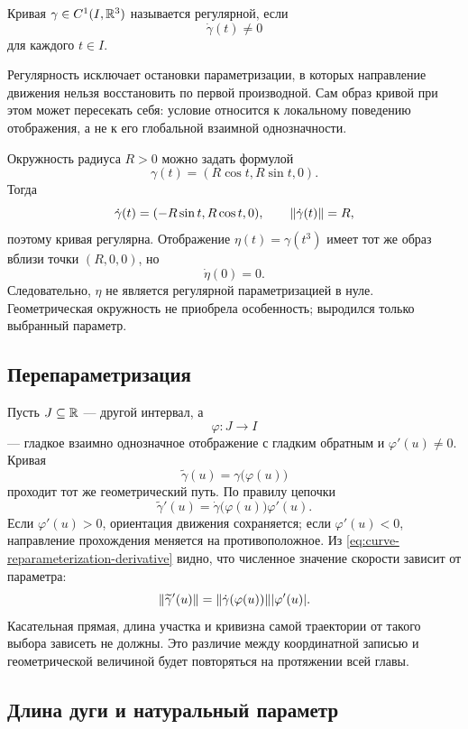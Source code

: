 \begin{definition}
Кривая \(\gamma\in C^1(I,\mathbb{R}^3)\) называется регулярной, если
\[
\dot\gamma(t)\neq0
\]
для каждого \(t\in I\).
\end{definition}

Регулярность исключает остановки параметризации, в которых направление движения нельзя восстановить по первой производной. Сам образ кривой при этом может пересекать себя: условие относится к локальному поведению отображения, а не к его глобальной взаимной однозначности.

\begin{example}
Окружность радиуса \(R>0\) можно задать формулой
\[
\gamma(t)=(R\cos t,R\sin t,0).
\]
Тогда
\[
\dot\gamma(t)=(-R\sin t,R\cos t,0),
\qquad
\lVert\dot\gamma(t)\rVert=R,
\]
поэтому кривая регулярна. Отображение \(\eta(t)=\gamma(t^3)\) имеет тот же образ вблизи точки \((R,0,0)\), но
\[
\dot\eta(0)=0.
\]
Следовательно, \(\eta\) не является регулярной параметризацией в нуле. Геометрическая окружность не приобрела особенность; выродился только выбранный параметр.
\end{example}

\subsection{Перепараметризация}

Пусть \(J\subseteq\mathbb{R}\) --- другой интервал, а
\[
\varphi:J\to I
\]
--- гладкое взаимно однозначное отображение с гладким обратным и \(\varphi'(u)\neq0\). Кривая
\[
\widetilde\gamma(u)=\gamma\bigl(\varphi(u)\bigr)
\]
проходит тот же геометрический путь. По правилу цепочки
\begin{equation}
\label{eq:curve-reparameterization-derivative}
\widetilde\gamma'(u)
=\dot\gamma\bigl(\varphi(u)\bigr)\varphi'(u).
\end{equation}
Если \(\varphi'(u)>0\), ориентация движения сохраняется; если \(\varphi'(u)<0\), направление прохождения меняется на противоположное. Из \eqref{eq:curve-reparameterization-derivative} видно, что численное значение скорости зависит от параметра:
\[
\lVert\widetilde\gamma'(u)\rVert
=\lVert\dot\gamma(\varphi(u))\rVert\lvert\varphi'(u)\rvert.
\]
Касательная прямая, длина участка и кривизна самой траектории от такого выбора зависеть не должны. Это различие между координатной записью и геометрической величиной будет повторяться на протяжении всей главы.

\subsection{Длина дуги и натуральный параметр}

